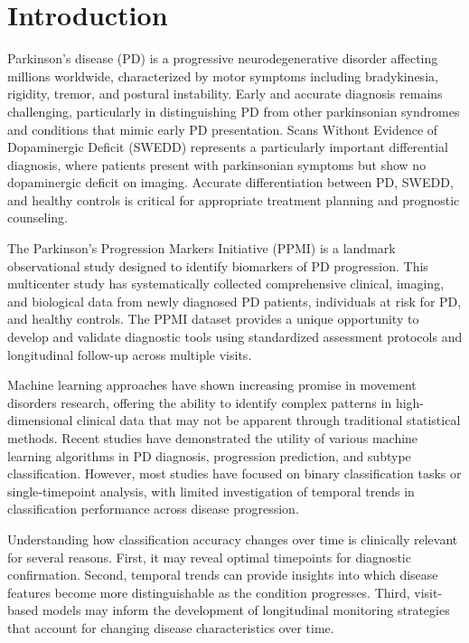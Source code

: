 \documentclass[12pt,a4paper]{article}
\begin{document}
\section{Introduction}

Parkinson's disease (PD) is a progressive neurodegenerative disorder affecting millions worldwide, characterized by motor symptoms including bradykinesia, rigidity, tremor, and postural instability. Early and accurate diagnosis remains challenging, particularly in distinguishing PD from other parkinsonian syndromes and conditions that mimic early PD presentation. Scans Without Evidence of Dopaminergic Deficit (SWEDD) represents a particularly important differential diagnosis, where patients present with parkinsonian symptoms but show no dopaminergic deficit on imaging. Accurate differentiation between PD, SWEDD, and healthy controls is critical for appropriate treatment planning and prognostic counseling.

The Parkinson's Progression Markers Initiative (PPMI) is a landmark observational study designed to identify biomarkers of PD progression. This multicenter study has systematically collected comprehensive clinical, imaging, and biological data from newly diagnosed PD patients, individuals at risk for PD, and healthy controls. The PPMI dataset provides a unique opportunity to develop and validate diagnostic tools using standardized assessment protocols and longitudinal follow-up across multiple visits.

Machine learning approaches have shown increasing promise in movement disorders research, offering the ability to identify complex patterns in high-dimensional clinical data that may not be apparent through traditional statistical methods. Recent studies have demonstrated the utility of various machine learning algorithms in PD diagnosis, progression prediction, and subtype classification. However, most studies have focused on binary classification tasks or single-timepoint analysis, with limited investigation of temporal trends in classification performance across disease progression.

Understanding how classification accuracy changes over time is clinically relevant for several reasons. First, it may reveal optimal timepoints for diagnostic confirmation. Second, temporal trends can provide insights into which disease features become more distinguishable as the condition progresses. Third, visit-based models may inform the development of longitudinal monitoring strategies that account for changing disease characteristics over time.
\end{document}
